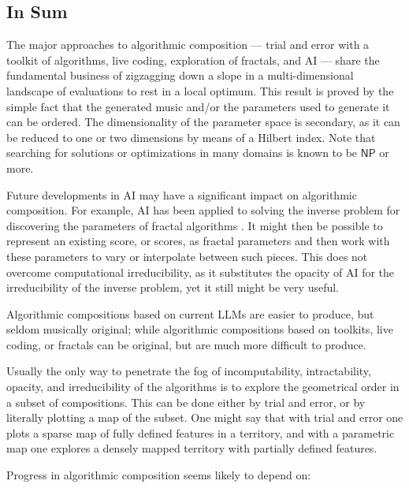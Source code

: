 \documentclass[]{interact}
\theoremstyle{plain}%
\theoremstyle{definition}
\theoremstyle{remark}
\begin{document}
\subsection{In Sum}

The major approaches to algorithmic composition --- trial and error with a toolkit of algorithms, live coding, exploration of fractals, and AI --- share the fundamental business of zigzagging down a slope in a multi-dimensional landscape of evaluations to rest in a local optimum. This result is proved by the simple fact that the generated music and/or the parameters used to generate it can be ordered. The dimensionality of the parameter space is secondary, as it can be reduced to one or two dimensions by means of a Hilbert index. Note that searching for solutions or optimizations in many domains is known to be $\mathsf{NP}$ or more.

Future developments in AI may have a significant impact on algorithmic composition. For example, AI has been applied to solving the inverse problem for discovering the parameters of fractal algorithms \citep{tu2023learning}. It might then be possible to represent an existing score, or scores, as fractal parameters and then work with these parameters to vary or interpolate between such pieces. This does not overcome computational irreducibility, as it substitutes the opacity of AI for the irreducibility of the inverse problem, yet it still might be very useful.

 Algorithmic compositions based on current LLMs are easier to produce, but seldom musically original; while algorithmic compositions based on toolkits, live coding, or fractals can be original, but are much more difficult to produce.

Usually the only way to penetrate the fog of incomputability, intractability, opacity, and irreducibility of the algorithms is to explore the geometrical order in a subset of compositions. This can be done either by trial and error, or by literally plotting a map of the subset. One might say that with trial and error one plots a sparse map of fully defined features in a territory, and with a parametric map one explores a densely mapped territory with partially defined features.

Progress in algorithmic composition seems likely to depend on:
\end{document}
